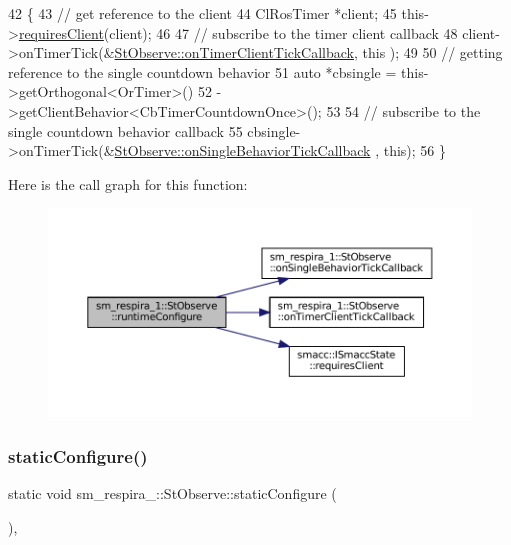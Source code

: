 \begin{DoxyCode}
42     \{
43         \textcolor{comment}{// get reference to the client}
44         ClRosTimer *client;
45         this->\hyperlink{classsmacc_1_1ISmaccState_a7f95c9f0a6ea2d6f18d1aec0519de4ac}{requiresClient}(client);
46 
47         \textcolor{comment}{// subscribe to the timer client callback}
48         client->onTimerTick(&\hyperlink{structsm__respira__1_1_1StObserve_a83c485ad4ae46796d84eb04ddabd97a2}{StObserve::onTimerClientTickCallback}, \textcolor{keyword}{this}
      );
49 
50         \textcolor{comment}{// getting reference to the single countdown behavior}
51         \textcolor{keyword}{auto} *cbsingle = this->getOrthogonal<OrTimer>()
52                              ->getClientBehavior<CbTimerCountdownOnce>();
53 
54         \textcolor{comment}{// subscribe to the single countdown behavior callback}
55         cbsingle->onTimerTick(&\hyperlink{structsm__respira__1_1_1StObserve_abe113ea6ed3da4ae0d97830bc7dae030}{StObserve::onSingleBehaviorTickCallback}
      , \textcolor{keyword}{this});
56     \}
\end{DoxyCode}
Here is the call graph for this function\+:
\nopagebreak
\begin{figure}[H]
\begin{center}
\leavevmode
\includegraphics[width=350pt]{structsm__respira__1_1_1StObserve_a3c1fe027b9396233475e8bd94fed6df7_cgraph}
\end{center}
\end{figure}
\mbox{\label{structsm__respira__1_1_1StObserve_aebbcdfd15dd19f49629e7bb21ff4624c}} 
\subsubsection{\texorpdfstring{static\+Configure()}{staticConfigure()}}
{\footnotesize\ttfamily static void sm\+\_\+respira\+\_\+::\+St\+Observe\+::static\+Configure (\begin{DoxyParamCaption}{ }\end{DoxyParamCaption})\hspace{0.3cm}{\ttfamily [inline]}, {\ttfamily [static]}}



